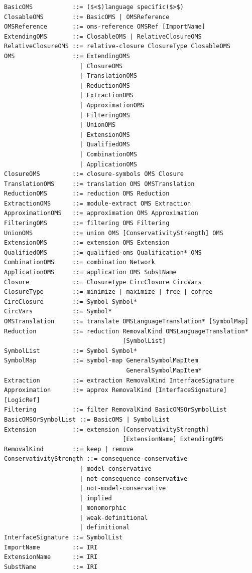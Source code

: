 \documentclass[10pt,fleqn,final]{scrreprt}
\newenvironment{definitions}[0]{\medskip }{}
\begin{document}
\begin{definitions}
\begin{lstlisting}[language=ebnf,escapeinside={()}]
BasicOMS           ::= ($<$)language specific($>$) 
ClosableOMS        ::= BasicOMS | OMSReference
OMSReference       ::= oms-reference OMSRef [ImportName]
ExtendingOMS       ::= ClosableOMS | RelativeClosureOMS
RelativeClosureOMS ::= relative-closure ClosureType ClosableOMS
OMS                ::= ExtendingOMS
                     | ClosureOMS
                     | TranslationOMS
                     | ReductionOMS
                     | ExtractionOMS
                     | ApproximationOMS
                     | FilteringOMS
                     | UnionOMS
                     | ExtensionOMS
                     | QualifiedOMS
                     | CombinationOMS
                     | ApplicationOMS
ClosureOMS         ::= closure-symbols OMS Closure
TranslationOMS     ::= translation OMS OMSTranslation
ReductionOMS       ::= reduction OMS Reduction
ExtractionOMS      ::= module-extract OMS Extraction
ApproximationOMS   ::= approximation OMS Approximation
FilteringOMS       ::= filtering OMS Filtering
UnionOMS           ::= union OMS [ConservativityStrength] OMS
ExtensionOMS       ::= extension OMS Extension
QualifiedOMS       ::= qualified-oms Qualification* OMS
CombinationOMS     ::= combination Network
ApplicationOMS     ::= application OMS SubstName
Closure            ::= ClosureType CircClosure CircVars
ClosureType        ::= minimize | maximize | free | cofree
CircClosure        ::= Symbol Symbol*
CircVars           ::= Symbol*
OMSTranslation     ::= translate OMSLanguageTranslation* [SymbolMap]
Reduction          ::= reduction RemovalKind OMSLanguageTranslation*
                                 [SymbolList]
SymbolList         ::= Symbol Symbol*
SymbolMap          ::= symbol-map GeneralSymbolMapItem
                                  GeneralSymbolMapItem*
Extraction         ::= extraction RemovalKind InterfaceSignature
Approximation      ::= approx RemovalKind [InterfaceSignature] [LogicRef]
Filtering          ::= filter RemovalKind BasicOMSOrSymbolList
BasicOMSOrSymbolList ::= BasicOMS | SymbolList
Extension          ::= extension [ConservativityStrength]
                                 [ExtensionName] ExtendingOMS
RemovalKind        ::= keep | remove
ConservativityStrength ::= consequence-conservative
                     | model-conservative
                     | not-consequence-conservative
                     | not-model-conservative
                     | implied
                     | monomorphic
                     | weak-definitional
                     | definitional
InterfaceSignature ::= SymbolList
ImportName         ::= IRI
ExtensionName      ::= IRI
SubstName          ::= IRI
\end{lstlisting}


\end{definitions}
\end{document}
